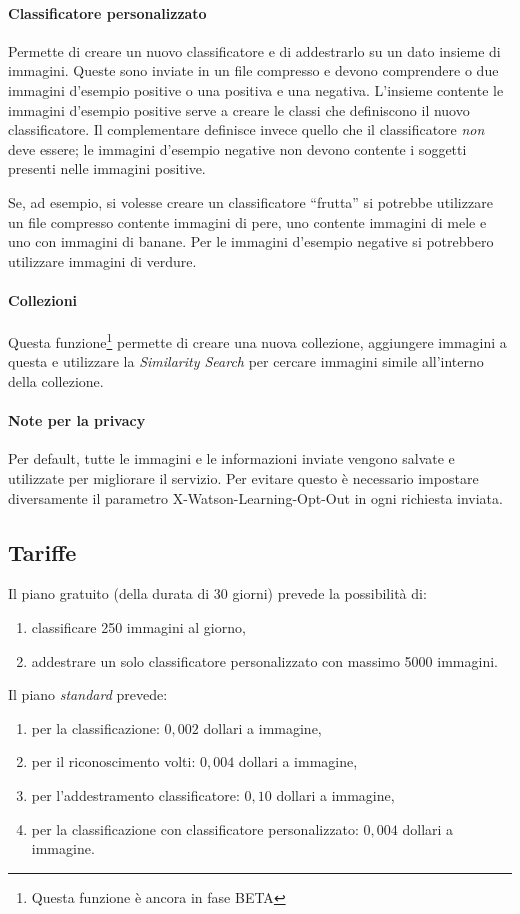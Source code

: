 \paragraph{Classificatore personalizzato} Permette di creare un nuovo classificatore e di addestrarlo su un dato insieme di immagini. Queste sono inviate in un file compresso e devono comprendere o due immagini d'esempio positive o una positiva e una negativa. L'insieme contente le immagini d'esempio positive serve a creare le classi che definiscono il nuovo classificatore. Il complementare definisce invece quello che il classificatore \textit{non} deve essere; le immagini d'esempio negative non devono contente i soggetti presenti nelle immagini positive.

Se, ad esempio, si volesse creare un classificatore ``frutta'' si potrebbe utilizzare un file compresso contente immagini di pere, uno contente immagini di mele e uno con immagini di banane.
Per le immagini d'esempio negative si potrebbero utilizzare immagini di verdure.

\paragraph{Collezioni} Questa funzione\footnote{Questa funzione è ancora in fase BETA} permette di creare una nuova collezione, aggiungere immagini a questa e utilizzare la \textit{Similarity Search} per cercare immagini simile all'interno della collezione.

\paragraph{Note per la privacy} Per default, tutte le immagini e le informazioni inviate vengono salvate e utilizzate per migliorare il servizio. Per evitare questo è necessario impostare diversamente il parametro \textsf{X-Watson-Learning-Opt-Out} in ogni richiesta inviata.

\subsection{Tariffe}
Il piano gratuito (della durata di 30 giorni) prevede la possibilità di:
\begin{enumerate}
\item classificare 250 immagini al giorno,
\item addestrare un solo classificatore personalizzato con massimo 5000 immagini.
\end{enumerate}
Il piano \textit{standard} prevede:
\begin{enumerate}
\item per la classificazione: $0,002$ dollari a immagine,
\item per il riconoscimento volti: $0,004$ dollari a immagine,
\item per l'addestramento classificatore: $0,10$ dollari a immagine,
\item per la classificazione con classificatore personalizzato: $0,004$ dollari a immagine.
\end{enumerate}
